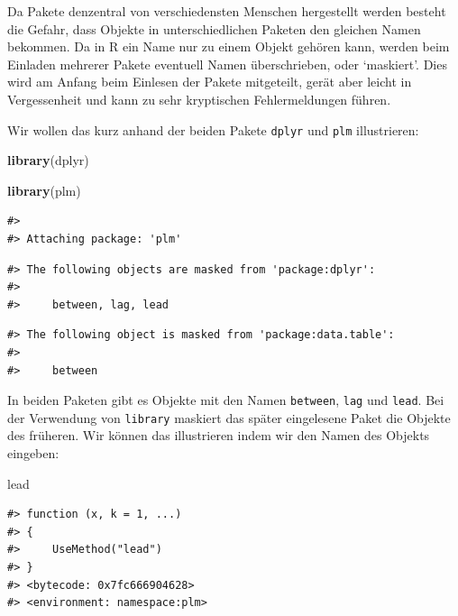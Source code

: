 \documentclass[]{book}
\newenvironment{Shaded}{\begin{snugshade}}{\end{snugshade}}
\newcommand{\KeywordTok}[1]{\textcolor[rgb]{0.13,0.29,0.53}{\textbf{#1}}}
\newcommand{\NormalTok}[1]{#1}
\begin{document}
Da Pakete denzentral von verschiedensten Menschen hergestellt werden
besteht die Gefahr, dass Objekte in unterschiedlichen Paketen den
gleichen Namen bekommen. Da in R ein Name nur zu einem Objekt gehören
kann, werden beim Einladen mehrerer Pakete eventuell Namen
überschrieben, oder `maskiert'. Dies wird am Anfang beim Einlesen der
Pakete mitgeteilt, gerät aber leicht in Vergessenheit und kann zu sehr
kryptischen Fehlermeldungen führen.

Wir wollen das kurz anhand der beiden Pakete \texttt{dplyr} und
\texttt{plm} illustrieren:

\begin{Shaded}
\begin{Highlighting}[]
\KeywordTok{library}\NormalTok{(dplyr)}
\end{Highlighting}
\end{Shaded}

\begin{Shaded}
\begin{Highlighting}[]
\KeywordTok{library}\NormalTok{(plm)}
\end{Highlighting}
\end{Shaded}

\begin{verbatim}
#> 
#> Attaching package: 'plm'
\end{verbatim}

\begin{verbatim}
#> The following objects are masked from 'package:dplyr':
#> 
#>     between, lag, lead
\end{verbatim}

\begin{verbatim}
#> The following object is masked from 'package:data.table':
#> 
#>     between
\end{verbatim}

In beiden Paketen gibt es Objekte mit den Namen \texttt{between},
\texttt{lag} und \texttt{lead}. Bei der Verwendung von \texttt{library}
maskiert das später eingelesene Paket die Objekte des früheren. Wir
können das illustrieren indem wir den Namen des Objekts eingeben:

\begin{Shaded}
\begin{Highlighting}[]
\NormalTok{lead}
\end{Highlighting}
\end{Shaded}

\begin{verbatim}
#> function (x, k = 1, ...) 
#> {
#>     UseMethod("lead")
#> }
#> <bytecode: 0x7fc666904628>
#> <environment: namespace:plm>
\end{verbatim}
\end{document}
